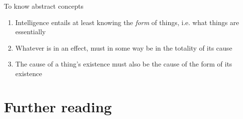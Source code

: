 \documentclass[xcolor=dvipsnames]{beamer}
\begin{document}
\begin{frame}[fragile]{To know abstract concepts}
  \begin{enumerate}
  \item Intelligence entails at least knowing the \emph{form} of things, i.e. what things are essentially \vspace{5mm}
  \item Whatever is in an effect, must in some way be in the totality of its cause \vspace{5mm}
  \item The cause of a thing's existence must also be the cause of the form of its existence \vspace{5mm}
  \end{enumerate}
\end{frame}


\section{Further reading}
\end{document}

